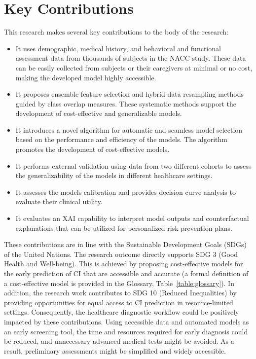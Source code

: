 \section{Key Contributions}
This research makes several key contributions to the body of the research:
\begin{itemize}
    \item It uses demographic, medical history, and behavioral and functional assessment data from thousands of subjects in the NACC study. These data can be easily collected from subjects or their caregivers at minimal or no cost, making the developed model highly accessible.
    \item It proposes ensemble feature selection and hybrid data resampling methods guided by class overlap measures. These systematic methods support the development of cost-effective and generalizable models.
    \item It introduces a novel algorithm for automatic and seamless model selection based on the performance and efficiency of the models. The algorithm promotes the development of cost-effective models.
    \item It performs external validation using data from two different cohorts to assess the generalizability of the models in different healthcare settings.
    \item It assesses the models calibration and provides decision curve analysis to evaluate their clinical utility.
    \item It evaluates an XAI capability to interpret model outputs and counterfactual explanations that can be utilized for personalized risk prevention plans.
\end{itemize}
\vspace{2em}

These contributions are in line with the Sustainable Development Goals (\acrshort{SDGs}) of the United Nations. The research outcome directly supports SDG 3 (Good Health and Well-being). This is achieved by proposing cost-effective models for the early prediction of CI that are accessible and accurate (a formal definition of a cost-effective model is provided in the Glossary, Table~\ref{table:glossary}). In addition, the research work contributes to SDG 10 (Reduced Inequalities) by providing opportunities for equal access to CI prediction in resource-limited settings. Consequently, the healthcare diagnostic workflow could be positively impacted by these contributions. Using accessible data and automated models as an early screening tool, the time and resources required for early diagnosis could be reduced, and unnecessary advanced medical tests might be avoided. As a result, preliminary assessments might be simplified and widely accessible.

